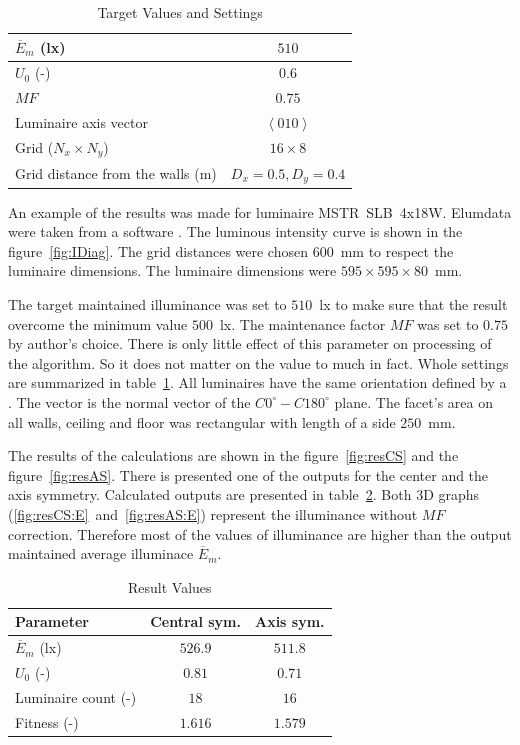 \begin{table}[htb]
	\renewcommand{\arraystretch}{1.3}
	\caption{Target Values and Settings}
 	\label{tab:trgVal}
	\centering
  \begin{tabular}{| l | c |}
    \hline
    $\overline{E}_{m}$ (lx) & $510$ \\
    \hline
    $U_{0}$ (-) & $0.6$ \\
    \hline
		$MF$ & $0.75$ \\
    \hline
		Luminaire axis vector & $\left\langle 010\right\rangle$ \\
    \hline
		Grid ($N_x \times N_y$) & $16 \times 8$ \\
    \hline
		Grid distance from the walls (m) & $D_x=0.5, D_y=0.4$ \\
    \hline
  \end{tabular}
\end{table}

An example of the results was made for luminaire MSTR~SLB~4x18W. Elumdata were taken from a software . The luminous intensity curve is shown in the figure~\ref{fig:IDiag}. The grid distances were chosen $600$~mm to respect the luminaire dimensions. The luminaire dimensions were $595\times 595\times 80$~mm.

The target maintained illuminance was set to $510$~lx to make sure that the result overcome the minimum value $500$~lx. The maintenance factor $MF$ was set  to $0.75$ by author's choice. There is only little effect of this parameter on processing of the algorithm. So it does not matter on the value to much in fact. Whole settings are summarized in table~\ref{tab:trgVal}. All luminaires have the same orientation defined by a . The vector is the normal vector of the $C0^\circ-C180^\circ$ plane. The facet's area on all walls, ceiling and floor was rectangular with length of a side $250$~mm.

The results of the calculations are shown in the figure~\ref{fig:resCS} and the figure~\ref{fig:resAS}. There is presented one of the outputs for the center and the axis symmetry.  Calculated outputs are presented in table~\ref{tab:resVal}. Both 3D graphs (\ref{fig:resCS:E}~and~\ref{fig:resAS:E}) represent the illuminance without $MF$ correction. Therefore most of the values of illuminance are higher than the output maintained average illuminace $\overline{E}_{m}$.

\begin{table}[htb]
	\renewcommand{\arraystretch}{1.3}
	\caption{Result Values}
 	\label{tab:resVal}
	\centering
  \begin{tabular}{| l | c | c |}
	  \hline
	  \textbf{Parameter} & \textbf{Central sym.} & \textbf{Axis sym.}\\
    \hline
    $\overline{E}_{m}$ (lx) & $526.9$ & $511.8$ \\
    \hline
    $U_{0}$ (-) & $0.81$ & $0.71$ \\
    \hline
		Luminaire count (-) & $18$ & $16$ \\
    \hline
		Fitness (-) & $1.616$ & $1.579$ \\
    \hline
  \end{tabular}
\end{table}


